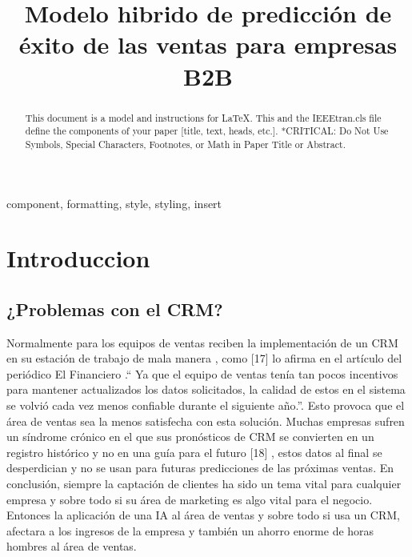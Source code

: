 \documentclass[conference]{IEEEtran}
\begin{document}
\title{Modelo hibrido de predicción de éxito de las ventas para empresas B2B}


\author{
\and
{}
}

\maketitle

\begin{abstract}
This document is a model and instructions for \LaTeX.
This and the IEEEtran.cls file define the components of your paper [title, text, heads, etc.]. *CRITICAL: Do Not Use Symbols, Special Characters, Footnotes, 
or Math in Paper Title or Abstract.
\end{abstract}

\begin{IEEEkeywords}
component, formatting, style, styling, insert
\end{IEEEkeywords}

\section{Introduccion}
\subsection{¿Problemas con el CRM?}
Normalmente para los equipos de ventas reciben la implementación de un
CRM en su estación de trabajo de mala manera , como [17] lo afirma en el
artículo del periódico El Financiero .“ Ya que el equipo de ventas tenía tan
pocos incentivos para mantener actualizados los datos solicitados, la
calidad de estos en el sistema se volvió cada vez menos confiable durante el
siguiente año.”. Esto provoca que el área de ventas sea la menos satisfecha
con esta solución.
Muchas empresas sufren un síndrome crónico en el que sus pronósticos de
CRM se convierten en un registro histórico y no en una guía para el futuro
[18] , estos datos al final se desperdician y no se usan para futuras
predicciones de las próximas ventas.
En conclusión, siempre la captación de clientes ha sido un tema vital para
cualquier empresa y sobre todo si su área de marketing es algo vital para el
negocio. Entonces la aplicación de una IA al área de ventas y sobre todo si usa un
CRM, afectara a los ingresos de la empresa y también un ahorro enorme de horas
hombres al área de ventas.
\end{document}
